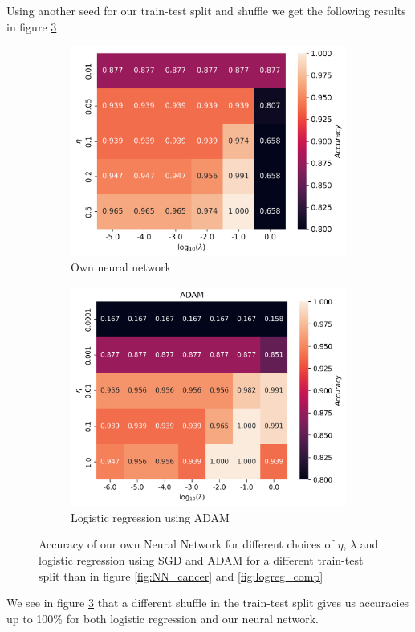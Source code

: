 \documentclass[11pt]{article}
\begin{document}
Using another seed for our train-test split and shuffle we get the following results in figure \ref{fig:cancer_best}
\begin{figure}[H]
  \begin{subfigure}{.5\textwidth}
    \centering
    \includegraphics[width=\textwidth]{../figures/cancer_eta_lmb_best.png}
    \caption{Own neural network}
    \label{fig:}
  \end{subfigure}
  \begin{subfigure}{.5\textwidth}
    \centering
    \includegraphics[width=\textwidth]{../figures/logreg_ADAM_best.png}
    \caption{Logistic regression using ADAM}
    \label{fig:}
  \end{subfigure}
  \caption{Accuracy of our own Neural Network for different choices of $\eta$, $\lambda$ and logistic regression using SGD and ADAM for a different train-test split than in figure \ref{fig:NN_cancer} and \ref{fig:logreg_comp}}
  \label{fig:cancer_best}
\end{figure}
We see in figure \ref{fig:cancer_best} that a different shuffle in the train-test split gives us accuracies up to 100\% for both logistic regression and our neural network.
\end{document}
